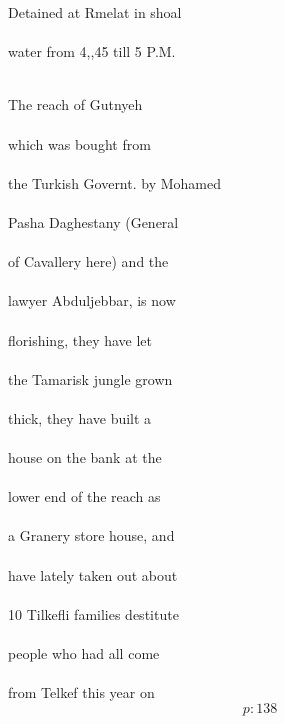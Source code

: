 \documentclass{report}
\begin{document}
	\par{
 	Detained at Rmelat in shoal\ \\\ \\water from 4,,45 till 5 P.M.\ \\\ \\
	}

	\par{
 	The reach of Gutnyeh\ \\\ \\which was bought from\ \\\ \\the Turkish Governt. by Mohamed\ \\\ \\Pasha Daghestany (General\ \\\ \\of Cavallery here) and the\ \\\ \\lawyer Abduljebbar, is now\ \\\ \\florishing, they have let\ \\\ \\the Tamarisk jungle grown\ \\\ \\thick, they have built a\ \\\ \\house on the bank at the\ \\\ \\lower end of the reach as\ \\\ \\a Granery store house, and\ \\\ \\have lately taken out about\ \\\ \\10 Tilkefli families destitute\ \\\ \\people who had all come\ \\\ \\from Telkef this year on\ \\
  \[p: 138 \]

	}

\end{document}
